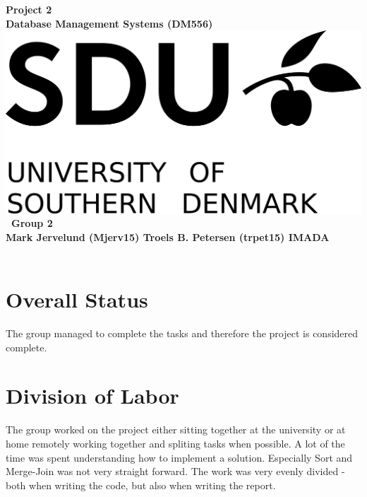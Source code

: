 \documentclass[a4paper,10pt,titlepage]{report}
\date{}
\begin{document}
\begin{titlepage}
\centering
    \vspace*{9\baselineskip}
    \huge
    \bfseries
    Project 2\\
    
    \normalfont 
	\huge    
    Database Management Systems (DM556)  \\[4\baselineskip]
    \normalfont
	\includegraphics[scale=1.5]{SDU_Logo}
    \vfill\
    Group 2\\
    Mark Jervelund (Mjerv15) Troels B. Petersen (trpet15)
    \vspace{5mm}
    IMADA \\
    \textbf{\datedate} \\[2\baselineskip]
\end{titlepage}

\setcounter{page}{1}
\renewcommand{\thepage}{\arabic{page}}

\lstset{language=Java}          %
\section{Overall Status}
The group managed to complete the tasks and therefore the project is considered complete.
\section{Division of Labor}
The group worked on the project either sitting together at the university or at home remotely working together and spliting tasks when possible. A lot of the time was spent understanding how to implement a solution. Especially Sort and Merge-Join was not very straight forward. The work was very evenly divided - both when writing the code, but also when writing the report.
\end{document}
